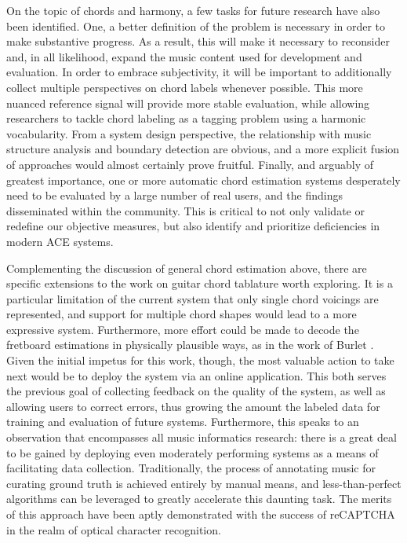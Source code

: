 On the topic of chords and harmony, a few tasks for future research have also been identified.
One, a better definition of the problem is necessary in order to make substantive progress.
As a result, this will make it necessary to reconsider and, in all likelihood, expand the music content used for development and evaluation.
In order to embrace subjectivity, it will be important to additionally collect multiple perspectives on chord labels whenever possible.
This more nuanced reference signal will provide more stable evaluation, while allowing researchers to tackle chord labeling as a tagging problem using a harmonic vocabularity.
From a system design perspective, the relationship with music structure analysis and boundary detection are obvious, and a more explicit fusion of approaches would almost certainly prove fruitful.
Finally, and arguably of greatest importance, one or more automatic chord estimation systems desperately need to be evaluated by a large number of real users, and the findings disseminated within the community.
This is critical to not only validate or redefine our objective measures, but also identify and prioritize deficiencies in modern ACE systems.

Complementing the discussion of general chord estimation above, there are specific extensions to the work on guitar chord tablature worth exploring.
It is a particular limitation of the current system that only single chord voicings are represented, and support for multiple chord shapes would lead to a more expressive system.
Furthermore, more effort could be made to decode the fretboard estimations in physically plausible ways, as in the work of Burlet \cite{Burlet2013Robotaba}.
Given the initial impetus for this work, though, the most valuable action to take next would be to deploy the system via an online application.
This both serves the previous goal of collecting feedback on the quality of the system, as well as allowing users to correct errors, thus growing the amount the labeled data for training and evaluation of future systems.
Furthermore, this speaks to an observation that encompasses all music informatics research:
there is a great deal to be gained by deploying even moderately performing systems as a means of facilitating data collection.
Traditionally, the process of annotating music for curating ground truth is achieved entirely by manual means, and less-than-perfect algorithms can be leveraged to greatly accelerate this daunting task.
The merits of this approach have been aptly demonstrated with the success of reCAPTCHA in the realm of optical character recognition.

